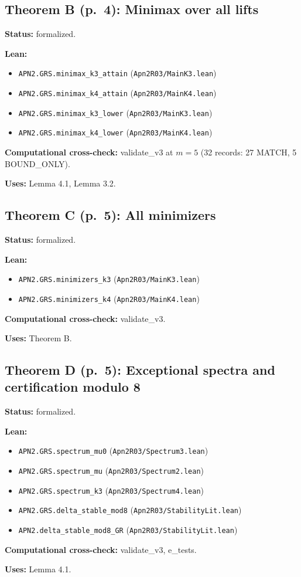 \documentclass[11pt]{article}
\begin{document}
\subsection*{Theorem B (p.~4): Minimax over all lifts}
\textbf{Status:} formalized.\par
\textbf{Lean:}\begin{itemize}\setlength\itemsep{0pt}
\item \texttt{APN2.GRS.minimax\_k3\_attain} \hfill (\texttt{Apn2R03/MainK3.lean})
\item \texttt{APN2.GRS.minimax\_k4\_attain} \hfill (\texttt{Apn2R03/MainK4.lean})
\item \texttt{APN2.GRS.minimax\_k3\_lower} \hfill (\texttt{Apn2R03/MainK3.lean})
\item \texttt{APN2.GRS.minimax\_k4\_lower} \hfill (\texttt{Apn2R03/MainK4.lean})
\end{itemize}
\textbf{Computational cross-check:} validate\_v3 at $m=5$ (32 records: 27 MATCH, 5 BOUND\_ONLY).\par
\textbf{Uses:} Lemma 4.1, Lemma 3.2.\par
\subsection*{Theorem C (p.~5): All minimizers}
\textbf{Status:} formalized.\par
\textbf{Lean:}\begin{itemize}\setlength\itemsep{0pt}
\item \texttt{APN2.GRS.minimizers\_k3} \hfill (\texttt{Apn2R03/MainK3.lean})
\item \texttt{APN2.GRS.minimizers\_k4} \hfill (\texttt{Apn2R03/MainK4.lean})
\end{itemize}
\textbf{Computational cross-check:} validate\_v3.\par
\textbf{Uses:} Theorem B.\par
\subsection*{Theorem D (p.~5): Exceptional spectra and certification modulo 8}
\textbf{Status:} formalized.\par
\textbf{Lean:}\begin{itemize}\setlength\itemsep{0pt}
\item \texttt{APN2.GRS.spectrum\_mu0} \hfill (\texttt{Apn2R03/Spectrum3.lean})
\item \texttt{APN2.GRS.spectrum\_mu} \hfill (\texttt{Apn2R03/Spectrum2.lean})
\item \texttt{APN2.GRS.spectrum\_k3} \hfill (\texttt{Apn2R03/Spectrum4.lean})
\item \texttt{APN2.GRS.delta\_stable\_mod8} \hfill (\texttt{Apn2R03/StabilityLit.lean})
\item \texttt{APN2.delta\_stable\_mod8\_GR} \hfill (\texttt{Apn2R03/StabilityLit.lean})
\end{itemize}
\textbf{Computational cross-check:} validate\_v3, e\_tests.\par
\textbf{Uses:} Lemma 4.1.\par
\end{document}
